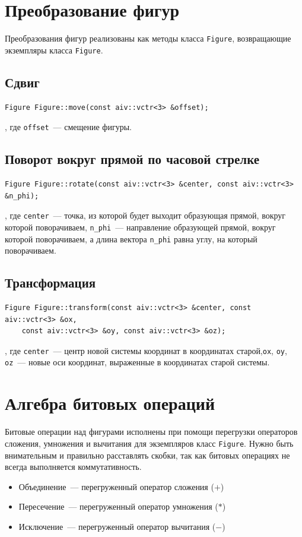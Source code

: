 \section{Преобразование фигур}
Преобразования фигур реализованы как методы класса \verb"Figure", возвращающие экземпляры класса \verb"Figure". 

\subsection{Сдвиг}
\begin{verbatim}
Figure Figure::move(const aiv::vctr<3> &offset);
\end{verbatim}
, где \verb"offset"~--- смещение фигуры.

\subsection{Поворот вокруг прямой по часовой стрелке}
\begin{verbatim}
Figure Figure::rotate(const aiv::vctr<3> &center, const aiv::vctr<3> &n_phi);
\end{verbatim}
, где \verb"center"~--- точка, из которой будет выходит образующая прямой, вокруг которой поворачиваем, \verb"n_phi"~--- направление образующей прямой, вокруг которой поворачиваем, а длина вектора \verb"n_phi" равна углу, на который поворачиваем.
\subsection{Трансформация}
\begin{verbatim}
Figure Figure::transform(const aiv::vctr<3> &center, const aiv::vctr<3> &ox, 
    const aiv::vctr<3> &oy, const aiv::vctr<3> &oz);
\end{verbatim}
, где \verb"center"~--- центр новой системы координат в координатах старой,\verb"ox", \verb"oy", \verb"oz"~--- новые оси координат, выраженные в координатах старой системы.

\section{Алгебра битовых операций}
Битовые операции над фигурами исполнены при помощи перегрузки операторов сложения, умножения и вычитания для экземпляров класс \verb"Figure".
Нужно быть внимательным и правильно расставлять скобки, так как битовых операциях не всегда выполняется коммутативность.
\begin{itemize}
    \item Объединение~--- перегруженный оператор сложения ($+$)
    \item Пересечение~--- перегруженный оператор умножения ($*$)
    \item Исключение~--- перегруженный оператор вычитания ($-$)
\end{itemize}

